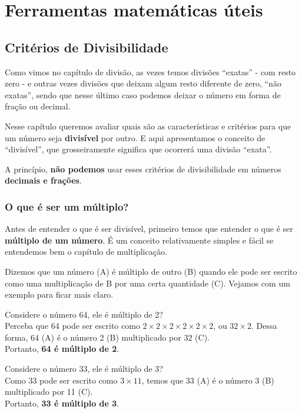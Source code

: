 \chapter{Ferramentas matemáticas úteis} 
\label{cap4}

\newpage
\section{Critérios de Divisibilidade}
Como vimos no capítulo de divisão, as vezes temos divisões ``exatas'' - com resto zero - e outras vezes divisões que deixam algum resto diferente de zero, ``não exatas'', sendo que nesse último caso podemos deixar o número em forma de fração ou decimal.

Nesse capítulo queremos avaliar quais são as características e critérios para que um número seja \textbf{divisível} por outro. E aqui apresentamos o conceito de ``divisível'', que grosseiramente significa que ocorrerá uma divisão ``exata''.

\begin{tcolorbox}[title = IMPORTANTE ]
    A princípio, \textbf{não podemos} usar esses critérios de divisibilidade em números \textbf{decimais e frações}.
\end{tcolorbox}

\subsection{O que é ser um múltiplo?}
Antes de entender o que é ser divisível, primeiro temos que entender o que é ser \textbf{múltiplo de um número}. É um conceito relativamente simples e fácil se entendemos bem o capítulo de multiplicação. 

Dizemos que um número (A) é múltiplo de outro (B) quando ele pode ser escrito como uma multiplicação de B por uma certa quantidade (C). Vejamos com um exemplo para ficar mais claro.

\begin{exemplo}
    Considere o número 64, ele é múltiplo de 2?\\

    Perceba que 64 pode ser escrito como \(2\times2\times2\times2\times2\times2\), ou \(32\times2\). Dessa forma, 64 (A) é o número 2 (B) multiplicado por 32 (C).\\

    Portanto, \textbf{64 é múltiplo de 2}.
\end{exemplo}

\begin{exemplo}
    Considere o número 33, ele é múltiplo de 3?\\

    Como 33 pode ser escrito como \(3\times11\), temos que 33 (A) é o número 3 (B) multiplicado por 11 (C).\\

    Portanto, \textbf{33 é múltiplo de 3}.
\end{exemplo}

